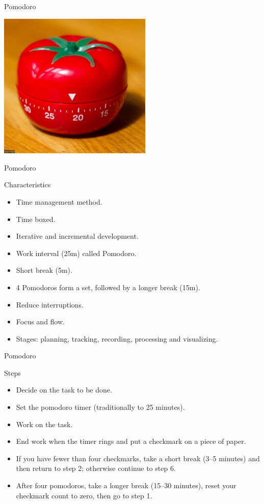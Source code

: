 \begin{frame}{Pomodoro}
  \begin{center}
    \includegraphics[height=7cm]{img/pomodoro.png}
  \end{center}
\end{frame}

\begin{frame}{Pomodoro}
  \begin{block}{Characteristics}
    \begin{itemize}
      \item Time management method.
      \item Time boxed.
      \item Iterative and incremental development.
      \item Work interval (25m) called Pomodoro.
      \item Short break (5m).
      \item 4 Pomodoros form a set, followed by a longer break (15m).
      \item Reduce interruptions.
      \item Focus and flow.
      \item Stages: planning, tracking, recording, processing and visualizing.
    \end{itemize}
  \end{block}
\end{frame}

\begin{frame}{Pomodoro}
  \begin{block}{Steps}
    \begin{itemize}
      \item Decide on the task to be done.
      \item Set the pomodoro timer (traditionally to 25 minutes).
      \item Work on the task.
      \item End work when the timer rings and put a checkmark on a piece of paper.
      \item If you have fewer than four checkmarks, take a short break (3–5 minutes) and then return to step 2; otherwise continue to step 6.
      \item After four pomodoros, take a longer break (15–30 minutes), reset your checkmark count to zero, then go to step 1.
    \end{itemize}
  \end{block}
\end{frame}

